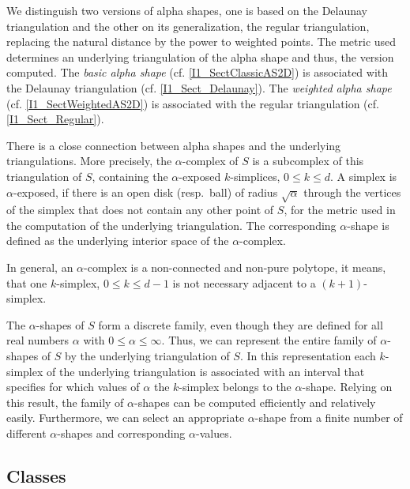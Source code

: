 We distinguish two versions of alpha shapes, one is based on the Delaunay
triangulation and the other on its generalization, the regular triangulation,
replacing the natural distance by the power to weighted points. The metric used
determines an underlying triangulation of the alpha shape and thus, the version
computed. 
The {\em basic alpha shape}
(cf. \ref{I1_SectClassicAS2D}) is associated with the Delaunay triangulation
(cf. \ref{I1_Sect_Delaunay}). The {\em weighted alpha shape}
(cf. \ref{I1_SectWeightedAS2D}) is associated with the regular triangulation
(cf. \ref{I1_Sect_Regular}). 

There is a close connection between alpha shapes and the underlying
triangulations. More precisely, the $\alpha$-complex of $S$ is a
subcomplex of this triangulation of $S$, containing the $\alpha$-exposed
$k$-simplices, $0 \leq k \leq d$. A simplex is $\alpha$-exposed, if there is an
open disk (resp.\ ball) of radius $\sqrt{\alpha}$ through the vertices of the
simplex that does not contain any other point of $S$, for the metric used in
the computation of the underlying triangulation.  The corresponding
$\alpha$-shape is defined as the underlying interior space of the
$\alpha$-complex. 

In general, an $\alpha$-complex is a non-connected and non-pure polytope, it
means, that one $k$-simplex, $0 \leq k \leq d-1$ is not necessary adjacent to
a $(k+1)$-simplex.

The $\alpha$-shapes of $S$ form a discrete family, even though they
are defined for all real numbers $\alpha$ with $0 \leq \alpha
\leq \infty$. Thus, we can represent the entire family of $\alpha$-shapes
of $S$ by the underlying triangulation of $S$. In this representation
each $k$-simplex of the underlying triangulation is associated with an
interval that specifies for which values of $\alpha$ the $k$-simplex
belongs to the $\alpha$-shape. Relying on this result, the family of
$\alpha$-shapes can be computed efficiently and relatively
easily. Furthermore, we can select an appropriate $\alpha$-shape from a
finite number of different $\alpha$-shapes and corresponding
$\alpha$-values.

\subsection*{Classes}

\\
\\
\\
\\
